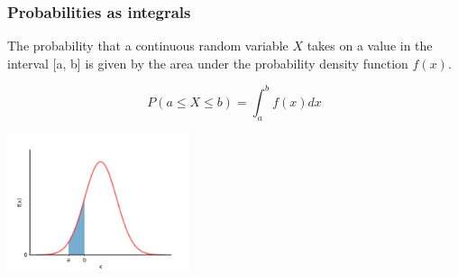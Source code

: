 \documentclass[10pt]{beamer}
\begin{document}


\begin{frame}
\frametitle{Probabilities as integrals}

The probability that a continuous random variable $X$ takes on a value in the interval [a, b] is given by the area under the probability density function $f(x)$.

\vspace{-0.25cm}

\begin{equation*}
P(a \leq X \leq b) = \int_a^b f(x) dx
\end{equation*}

\vspace{-0.5cm}
\begin{center}
\includegraphics[height=4cm]{images/normal_area.png}
\end{center}

\end{frame}
\end{document}
